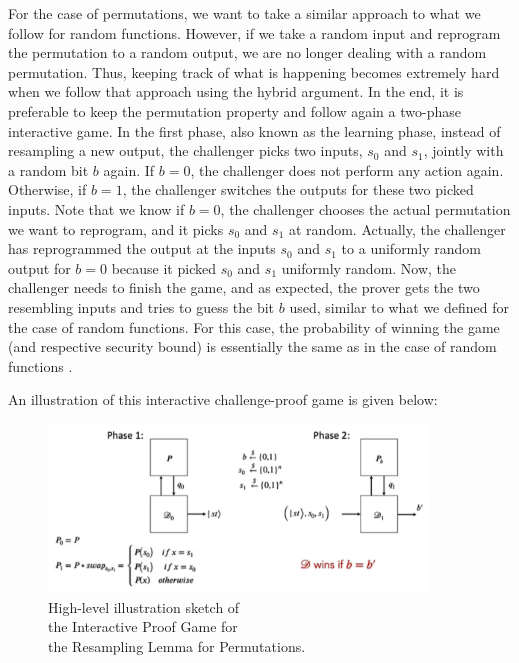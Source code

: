 \documentclass[12pt]{article}
\begin{document}
    For the case of permutations, we want to take a similar approach to what we follow for random functions. However, if we take a random input and reprogram the permutation to a random output, we are no longer dealing with a random permutation. Thus, keeping track of what is happening becomes extremely hard when we follow that approach using the hybrid argument. In the end, it is preferable to keep the permutation property and follow again a two-phase interactive game. In the first phase, also known as the learning phase, instead of resampling a new output, the challenger picks two inputs, ${s}_{0}$ and ${s}_{1}$, jointly with a random bit $b$ again. If $b = 0$, the challenger does not perform any action again. Otherwise, if $b = 1$, the challenger switches the outputs for these two picked inputs. Note that we know if $b = 0$, the challenger chooses the actual permutation we want to reprogram, and it picks ${s}_{0}$ and ${s}_{1}$ at random. Actually, the challenger has reprogrammed the output at the inputs ${s}_{0}$ and ${s}_{1}$ to a uniformly random output for $b = 0$ because it picked ${s}_{0}$ and ${s}_{1}$ uniformly random. Now, the challenger needs to finish the game, and as expected, the prover gets the two resembling inputs and tries to guess the bit $b$ used, similar to what we defined for the case of random functions. For this case, the probability of winning the game (and respective security bound) is essentially the same as in the case of random functions \cite{alagic-bai-katz-majenz:post-quantum-security-even-mansour-cipher:2021:03-2024}.
        
    
    \noindent An illustration of this interactive challenge-proof game is given below:
    
    \begin{figure}[ht]
        \captionsetup{justification=centering}
        \centering
        
        \includegraphics[width=0.9\textwidth]{figures/images/img-8.pdf}
        \caption{High-level illustration sketch of\\ the Interactive Proof Game for\\ the Resampling Lemma for Permutations.}
    \end{figure}
\end{document}
